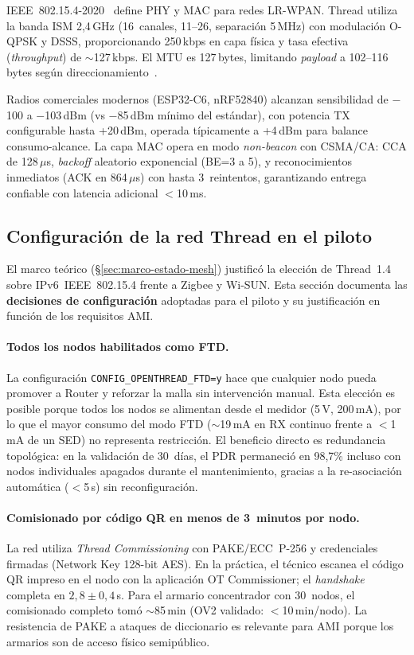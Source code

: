IEEE~802.15.4-2020~\cite{IEEE802154-2020} define PHY y MAC para redes LR-WPAN. Thread utiliza la banda ISM 2,4\,GHz (16~canales, 11--26, separación 5\,MHz) con modulación O-QPSK y DSSS, proporcionando 250\,kbps en capa física y tasa efectiva (\textit{throughput}) de $\sim$127\,kbps. El MTU es 127\,bytes, limitando \emph{payload} a 102--116\,bytes según direccionamiento~\cite{shelby6LoWPANWirelessEmbedded2009, RFC4944}.

Radios comerciales modernos (ESP32-C6, nRF52840) alcanzan sensibilidad de $-$100 a $-$103\,dBm (vs $-$85\,dBm mínimo del estándar), con potencia TX configurable hasta +20\,dBm, operada típicamente a +4\,dBm para balance consumo-alcance. La capa MAC opera en modo \emph{non-beacon} con CSMA/CA: CCA de 128\,$\mu$s, \emph{backoff} aleatorio exponencial (BE=3 a 5), y reconocimientos inmediatos (ACK en 864\,$\mu$s) con hasta 3~reintentos, garantizando entrega confiable con latencia adicional $<$10\,ms.

\subsection{Configuración de la red Thread en el piloto}
\label{sec:nodo-thread}

El marco teórico (§\ref{sec:marco-estado-mesh}) justificó la elección de Thread~1.4 sobre IPv6~IEEE~802.15.4 frente a Zigbee y Wi-SUN. Esta sección documenta las \textbf{decisiones de configuración} adoptadas para el piloto y su justificación en función de los requisitos AMI.



\paragraph{Todos los nodos habilitados como FTD.}
La configuración \texttt{CONFIG\_OPENTHREAD\_FTD=y} hace que cualquier nodo pueda promover a Router y reforzar la malla sin intervención manual. Esta elección es posible porque todos los nodos se alimentan desde el medidor (5\,V, 200\,mA), por lo que el mayor consumo del modo FTD ($\sim$19\,mA en RX continuo frente a $<$1\,mA de un SED) no representa restricción. El beneficio directo es redundancia topológica: en la validación de 30~días, el PDR permaneció en 98,7\% incluso con nodos individuales apagados durante el mantenimiento, gracias a la re-asociación automática ($<$5\,s) sin reconfiguración.

\paragraph{Comisionado por código QR en menos de 3~minutos por nodo.}
La red utiliza \emph{Thread Commissioning} con PAKE/ECC~P-256 y credenciales firmadas (Network Key 128-bit AES). En la práctica, el técnico escanea el código QR impreso en el nodo con la aplicación OT Commissioner; el \emph{handshake} completa en $2{,}8 \pm 0{,}4$\,s. Para el armario concentrador con 30~nodos, el comisionado completo tomó $\sim$85\,min (OV2 validado: $<$10\,min/nodo). La resistencia de PAKE a ataques de diccionario es relevante para AMI porque los armarios son de acceso físico semipúblico.

